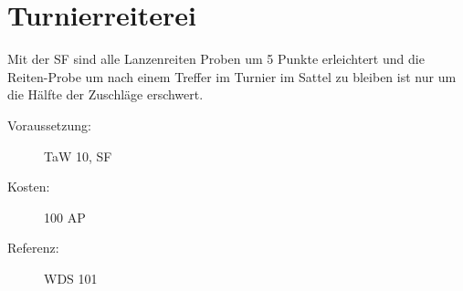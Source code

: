 \section{Turnierreiterei}
\label{sf.turnierreiterei}
Mit der SF  sind alle Lanzenreiten Proben um 5 Punkte erleichtert und die Reiten-Probe um nach einem Treffer im Turnier im Sattel zu bleiben ist nur um die Hälfte der Zuschläge erschwert.
\begin{description}
    \item[Voraussetzung:]
        TaW  10, SF 
    \item [Kosten:]
        100 AP
    \item [Referenz:]
        WDS 101
\end{description}
